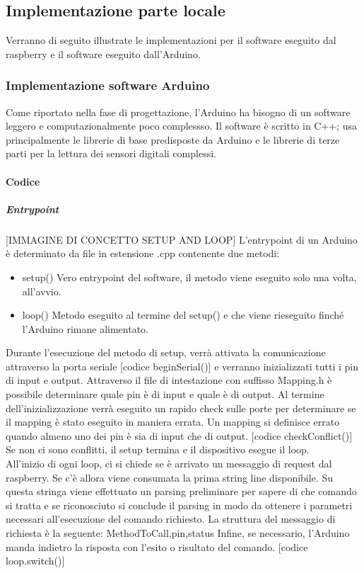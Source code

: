 \documentclass[12pt]{article}
\begin{document}
\subsection{Implementazione parte locale}
Verranno di seguito illustrate le implementazioni per il software eseguito dal raspberry e il software eseguito dall'Arduino.
\subsubsection{Implementazione software Arduino}
Come riportato nella fase di progettazione, l'Arduino ha bisogno di un software leggero e computazionalmente poco complessso. Il software è scritto in C++; usa principalmente le librerie di base predisposte da Arduino e le librerie di terze parti per la lettura dei sensori digitali complessi.
\paragraph{Codice}
\subparagraph{Entrypoint}
[IMMAGINE DI CONCETTO SETUP AND LOOP]
L'entrypoint di un Arduino è determinato da file in estensione .cpp contenente due metodi:
\begin{itemize}
\item setup() Vero entrypoint del software, il metodo viene eseguito solo una volta, all'avvio.
\item loop() Metodo eseguito al termine del setup() e che viene rieseguito finché l'Arduino rimane alimentato.
\end{itemize}
Durante l'esecuzione del metodo di setup, verrà attivata la comunicazione attraverso la porta seriale [codice beginSerial()] e verranno inizializzati tutti i pin di input e output. Attraverso il file di intestazione con suffisso Mapping.h è possibile determinare quale pin è di input e quale è di output.
Al termine dell'inizializzazione verrà eseguito un rapido check sulle porte per determinare se il mapping è stato eseguito in maniera errata. Un mapping si definisce errato quando almeno uno dei pin è sia di input che di output.
[codice checkConflict()]
Se non ci sono conflitti, il setup termina e il dispositivo esegue il loop.\\
All'inizio di ogni loop, ci si chiede se è arrivato un messaggio di request dal raspberry. Se c'è allora viene consumata la prima string line disponibile. Su questa stringa viene effettuato un parsing preliminare per sapere di che comando si tratta e se riconosciuto si conclude il parsing in modo da ottenere i parametri necessari all'esecuzione del comando richiesto.
La struttura del messaggio di richiesta è la seguente:
MethodToCall,pin,status
 Infine, se necessario, l'Arduino manda indietro la risposta con l'esito o risultato del comando. [codice loop.switch()]
\end{document}
